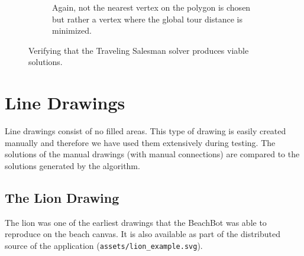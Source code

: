 \begin{figure}
\begin{subfigure}[b]{0.45\textwidth}
\caption{Again, not the nearest vertex on the polygon is chosen but rather a vertex where the global tour distance is minimized.}
\end{subfigure}
\caption{Verifying that the Traveling Salesman solver produces viable solutions.}\label{fig:ver_tsp}
\end{figure}

\clearpage
\section{Line Drawings}

Line drawings consist of no filled areas. This type of drawing is easily created manually and therefore we have used them extensively during testing. The solutions of the manual drawings (with manual connections) are compared to the solutions generated by the algorithm.

\subsection{The Lion Drawing}

The lion was one of the earliest drawings that the BeachBot was able to reproduce on the beach canvas. It is also available as part of the distributed source of the application (\texttt{assets/lion\_example.svg}).

